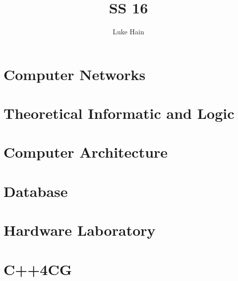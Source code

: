 \documentclass[a4paper, 12pt] {report} %
\author{Luke Hain}
\begin{document}
\title{SS 16}
\maketitle

\tableofcontents{}

\part{Computer Networks}



\part{Theoretical Informatic and Logic}



\part{Computer Architecture}



\part{Database}




\part{Hardware Laboratory}
%

\part{C++4CG}
%


 

\end{document}
